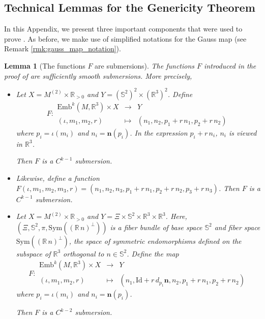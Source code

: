 \documentclass[11pt]{article}
\newcommand{\R}{\mathbb{R}}
\newcommand{\io}{\iota}
\newcommand{\nbf}{\mathbf{n}}
\newcommand{\Emb}{\mathrm{Emb}^k(M,\R^3)}
\newcommand{\Id}{\mathrm{Id}}
\theoremstyle{plain}
\newtheorem{lem}{Lemma}
\theoremstyle{definition}
\theoremstyle{remark}
\begin{document}
	\subsection{Technical Lemmas for the Genericity Theorem}
	
	
	In this Appendix, we present three important components that were used to prove .
	As before, we make use of simplified notations for the Gauss map (see Remark \ref{rmk:gauss_map_notation}). 
	
	\begin{lem}[The functions $F$ are submersions]
		\label{lem:submersion}
		The functions $F$ introduced in the proof of  are sufficiently smooth submersions. More precisely,
		\begin{itemize}
			\item
			Let $X = M^{(2)} \times \R_{>0}$ and $Y = (\mathbb{S}^2)^2 \times (\R^3)^2$. Define 
			\begin{equation}
				F:
				\begin{array}{ccc}
					\Emb \times X & \to & Y \\
					(\io, m_1,m_2,r) & \mapsto & (n_1, n_2, p_1 + r \, n_1, p_2 + r \, n_2 )
				\end{array}
			\end{equation}
			where $p_i = \io(m_i)$ and $n_i = \nbf(p_i)$. In the expression $p_i + r \, n_i$, $n_i$ is viewed in $\R^3$.
			
			Then $F$ is a $C^{k-1}$ submersion.
			
			\item Likewise, define a function $F(\io, m_1,m_2,m_3,r) = (n_1, n_2, n_3, p_1 + r \, n_1, p_2 + r \, n_2 , p_3 + r \, n_3)$.
			Then $F$ is a $C^{k-1}$ submersion.
			
			\item Let $X = M^{(2)} \times \R_{>0}$ and $Y = \Xi \times \mathbb{S}^2 \times \R^3 \times \R^3$. Here, $(\Xi, \mathbb{S}^2, \pi, \mathrm{Sym}((\R \, n)^\perp))$ is a fiber bundle of base space $\mathbb{S}^2$ and fiber space $\mathrm{Sym}((\R \, n)^\perp)$, the space of symmetric endomorphisms defined on the subspace of $\R^3$ orthogonal to $n \in \mathbb{S}^2$.
			Define the map
			\begin{equation}
				F:
				\begin{array}{ccc}
					\Emb \times X & \to & Y \\
					(\io, m_1,m_2,r) & \mapsto & (n_1, \Id + r \, d_{p_1}\nbf, n_2, p_1 + r \, n_1, p_2 + r \, n_2 )
				\end{array}
			\end{equation}
			where $p_i = \io(m_i)$ and $n_i = \nbf(p_i)$.
			
			Then $F$ is a $C^{k-2}$ submersion.
		\end{itemize}
	\end{lem}
\end{document}
